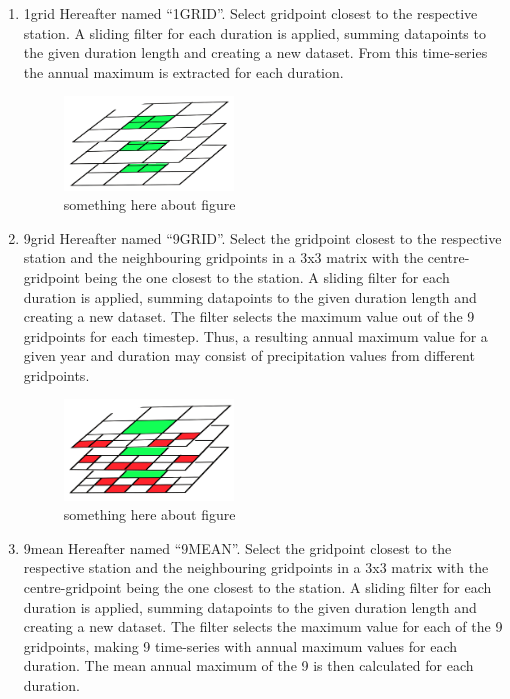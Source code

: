 \begin{enumerate}

\item 1grid 
Hereafter named “1GRID”. Select gridpoint closest to the respective station. A sliding filter for each duration is applied, summing datapoints to the given duration length and creating a new dataset. From this time-series the annual maximum is extracted for each duration.

\begin{figure}[hbt!]
    \centering
    \includegraphics[width=4.5cm]{figures/met1g.PNG}
    \caption{something here about figure}
    \label{fig:my_label}
\end{figure}

\item 9grid
Hereafter named “9GRID”. Select the gridpoint closest to the respective station and the neighbouring gridpoints in a 3x3 matrix with the centre-gridpoint being the one closest to the station. A sliding filter for each duration is applied, summing datapoints to the given duration length and creating a new dataset. The filter selects the maximum value out of the 9 gridpoints for each timestep. Thus, a resulting annual maximum value for a given year and duration may consist of precipitation values from different gridpoints. 

\begin{figure}[hbt!]
    \centering
    \includegraphics[width=4.5cm]{figures/met9g.PNG}
    \caption{something here about figure}
    \label{fig:my_label}
\end{figure}

\item 9mean
Hereafter named “9MEAN”. Select the gridpoint closest to the respective station and the neighbouring gridpoints in a 3x3 matrix with the centre-gridpoint being the one closest to the station. A sliding filter for each duration is applied, summing datapoints to the given duration length and creating a new dataset. The filter selects the maximum value for each of the 9 gridpoints, making 9 time-series with annual maximum values for each duration. The mean annual maximum of the 9 is then calculated for each duration.  


\end{enumerate}
